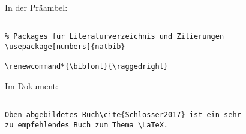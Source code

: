
In der Präambel:

\begin{verbatim}

% Packages für Literaturverzeichnis und Zitierungen
\usepackage[numbers]{natbib}

\renewcommand*{\bibfont}{\raggedright}

\end{verbatim}

\tcblower

Im Dokument: 

\begin{verbatim}

Oben abgebildetes Buch\cite{Schlosser2017} ist ein sehr 
zu empfehlendes Buch zum Thema \LaTeX. 

\end{verbatim}
